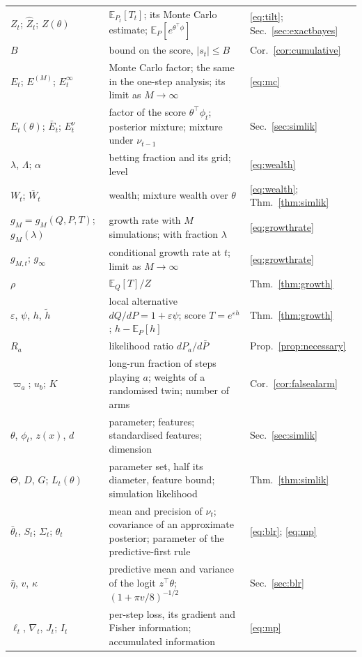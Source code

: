 \documentclass[pdflatex,sn-mathphys-ay]{sn-jnl}
\newcommand{\E}{\mathbb{E}}
\theoremstyle{thmstyleone}
\theoremstyle{thmstyletwo}
\begin{document}
\begin{appendices}
{\begin{tabular}{lll}
$Z_t$; $\widehat Z_t$; $Z(\theta)$ & $\E_{P_t}[T_t]$; its Monte Carlo estimate; $\E_P[e^{\theta^\top\phi}]$ & \eqref{eq:tilt}; Sec.~\ref{sec:exactbayes} \\
$B$ & bound on the score, $|s_t| \le B$ & Cor.~\ref{cor:cumulative} \\
$E_t$; $E^{(M)}$; $E_t^\infty$ & Monte Carlo factor; the same in the one-step analysis; its limit as $M \to \infty$ & \eqref{eq:mc} \\
$E_t(\theta)$; $\bar E_t$; $E_t^{\nu}$ & factor of the score $\theta^\top\phi_t$; posterior mixture; mixture under $\nu_{t-1}$ & Sec.~\ref{sec:simlik} \\
$\lambda$, $\Lambda$; $\alpha$ & betting fraction and its grid; level & \eqref{eq:wealth} \\
$W_t$; $\bar W_t$ & wealth; mixture wealth over $\theta$ & \eqref{eq:wealth}; Thm.~\ref{thm:simlik} \\
\midrule
$g_M = g_M(Q, P, T)$; $g_M(\lambda)$ & growth rate with $M$ simulations; with fraction $\lambda$ & \eqref{eq:growthrate} \\
$g_{M,t}$; $g_\infty$ & conditional growth rate at $t$; limit as $M \to \infty$ & \eqref{eq:growthrate} \\
$\rho$ & $\E_Q[T]/Z$ & Thm.~\ref{thm:growth} \\
$\varepsilon$, $\psi$, $h$, $\tilde h$ & local alternative $dQ/dP = 1 + \varepsilon\psi$; score $T = e^{\varepsilon h}$; $h - \E_P[h]$ & Thm.~\ref{thm:growth} \\
$R_a$ & likelihood ratio $dP_a/d\bar P$ & Prop.~\ref{prop:necessary} \\
$\varpi_a$; $u_b$; $K$ & long-run fraction of steps playing $a$; weights of a randomised twin; number of arms & Cor.~\ref{cor:falsealarm} \\
\midrule
$\theta$, $\phi_t$, $z(x)$, $d$ & parameter; features; standardised features; dimension & Sec.~\ref{sec:simlik} \\
$\Theta$, $D$, $G$; $L_t(\theta)$ & parameter set, half its diameter, feature bound; simulation likelihood & Thm.~\ref{thm:simlik} \\
$\bar\theta_t$, $S_t$; $\Sigma_t$; $\theta_t$ & mean and precision of $\nu_t$; covariance of an approximate posterior; parameter of the predictive-first rule & \eqref{eq:blr}; \eqref{eq:mp} \\
$\bar\eta$, $v$, $\kappa$ & predictive mean and variance of the logit $z^\top\theta$; $(1 + \pi v/8)^{-1/2}$ & Sec.~\ref{sec:blr} \\
$\ell_t$, $\nabla_t$, $J_t$; $I_t$ & per-step loss, its gradient and Fisher information; accumulated information & \eqref{eq:mp} \\

\end{tabular}}
\end{appendices}
\end{document}

